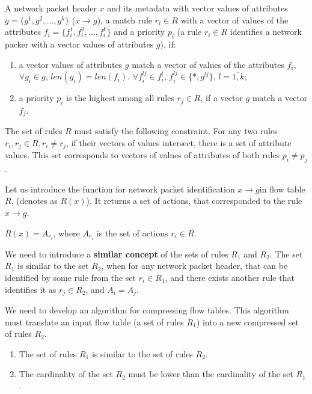 \documentclass[conference]{IEEEtran}
\begin{document}
        A network packet header \(x\) and its metadata with vector values of attributes \(g=\{g^1,g^2,\ldots,g^k\}\) (\(x \rightarrow g\)),
        a match rule \(r_i\in R\) with a vector of values of the attributes \(f_i=\{f_i^1,f_i^2,\ldots,f_i^k\}\) 
        and a priority \(p_i\) (a rule \(r_i\in R\) identifies a network packer with a vector values of attributes \(g\)), if:

        \begin{enumerate}
            \item a vector values of attributes \(g\) match a vector of values of the attributes \(f_i\), 
                \(\forall g_i \in g\), \(len(g_i) = len(f_i)\). \(\forall f_i^{lj} \in f_i^l\), \(f_i^{lj} \in \{*, g^{lj}\}\), \(l=\overline{1,k}\);
            \item a priority \(p_i\) is the highest among all rules \(r_j\in R\), if a vector \(g\) match a vector\(f_j\).
        \end{enumerate}

        The set of rules \(R\) must satisfy the following constraint. 
        For any two rules \(r_i,r_j\in R,r_i\not= r_j\),  if their vectors of values intersect, there is a set of attribute values. 
        This set corresponds to vectors of values of attributes of both rules  \(p_i\not= p_j\). 
        
        Let us introduce the function for network packet identification \(x \rightarrow g\)in flow table \(R\), (denotes as \(R(x)\)).
        It returns a set of actions, that corresponded to the rule \(x \rightarrow g\). 
        \begin{center}
            \(R(x) = A_{r_i}\), where \(A_{r_i}\) is the set of actions \(r_i \in R\).
        \end{center}

        We need to introduce a {\bf similar concept} of the sets of rules \(R_1\) and \(R_2\).
        The set \(R_1\) is similar to the set \(R_2\), when for any network packet header, 
        that can be identified by some rule from the set \(r_i \in R_1\),
        and there exists another rule that identifies it as \(r_j \in R_2\), and \(A_i = A_j\).

        We need to develop an algorithm for compressing flow tables. This algorithm must translate an input flow table (a set of rules \(R_1\))
        into a new compressed set of rules \(R_2\). 
        \begin{enumerate}
            \item The set of rules \(R_1\) is similar to the set of rules \(R_2\).
            \item The cardinality of the set \(R_2\) must be lower than the cardinality of the set \(R_1\).
        \end{enumerate}
    
\end{document}
